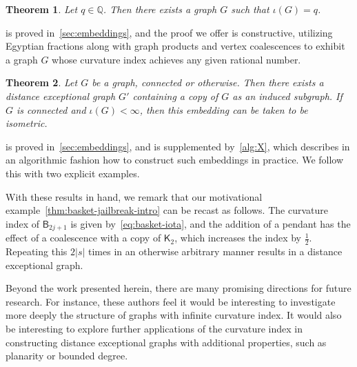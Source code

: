 \documentclass[11pt,a4paper]{article}
\newcommand{\Basket}{\mathsf{B}}
\newcommand{\Complete}{\mathsf{K}}
\newtheorem{theorem}{Theorem}[section]
\begin{document}
    \begin{theorem}\label{thm:intro-rational-index}
        Let $q\in\mathbb{Q}$. Then there exists a graph $G$ such that $\iota(G) = q$.
    \end{theorem}

     is proved in~\cref{sec:embeddings}, and the proof we offer is constructive, utilizing Egyptian fractions along with graph products and vertex coalescences to exhibit a graph $G$ whose curvature index achieves any given rational number. 

    \begin{theorem}\label{thm:intro-embedding}
        Let $G$ be a graph, connected or otherwise. Then there exists a distance exceptional graph $G'$ containing a copy of $G$ as an induced subgraph. If $G$ is connected and $\iota(G) < \infty$, then this embedding can be taken to be isometric. 
    \end{theorem}

     is proved in~\cref{sec:embeddings}, and is supplemented by~\cref{alg:X}, which describes in an algorithmic fashion how to construct such embeddings in practice. We follow this with two explicit examples.
    
    With these results in hand, we remark that our motivational example~\cref{thm:basket-jailbreak-intro} can be recast as follows. The curvature index of $\Basket_{2j+1}$ is given by~\cref{eq:basket-iota}, and the addition of a pendant has the effect of a coalescence with a copy of $\Complete_2$, which increases the index by $\frac{1}{2}$. Repeating this $2|s|$ times in an otherwise arbitrary manner results in a distance exceptional graph.
    
    Beyond the work presented herein, there are many promising directions for future research. For instance, these authors feel it would be interesting to investigate more deeply the structure of graphs with infinite curvature index. It would also be interesting to explore further applications of the curvature index in constructing distance exceptional graphs with additional properties, such as planarity or bounded degree.
\end{document}
